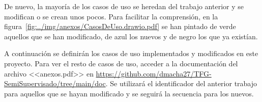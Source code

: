 De nuevo, la mayoría de los casos de uso se heredan del trabajo anterior y se modifican o se crean unos pocos. Para facilitar la comprensión, en la figura~\ref{fig:../img/anexos/CasosDeUso.drawio.pdf} se han pintado de verde aquellos que se han modificado, de azul los nuevos y de negro los que ya existían.


A continuación se definirán los casos de uso implementados y modificados en este proyecto. Para ver el resto de casos de uso, acceder a la documentación del archivo <<anexos.pdf>> en \url{https://github.com/dmacha27/TFG-SemiSupervisado/tree/main/doc}. Se utilizará el identificador del anterior trabajo para aquellos que se hayan modificado y se seguirá la secuencia para los nuevos.

